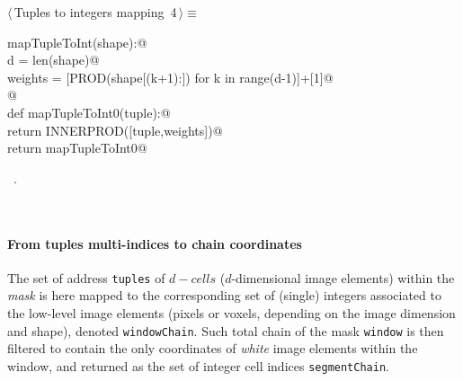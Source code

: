 \documentclass[11pt,oneside]{article}	%
\begin{document}
\begin{flushleft} \small
\begin{minipage}{\linewidth} \label{scrap6}
\protect{}$\langle\,$Tuples to integers mapping\nobreak\ {\footnotesize 4}$\,\rangle\equiv$
\vspace{-1ex}
\begin{list}{}{} \item
\mbox{}\verb@def mapTupleToInt(shape):@\\
\mbox{}\verb@   d = len(shape)@\\
\mbox{}\verb@   weights = [PROD(shape[(k+1):]) for k in range(d-1)]+[1]@\\
\mbox{}\verb@   @\\
\mbox{}\verb@   def mapTupleToInt0(tuple):@\\
\mbox{}\verb@      return INNERPROD([tuple,weights])@\\
\mbox{}\verb@   return mapTupleToInt0@\\
\mbox{}\verb@@{\NWsep}
\end{list}
\vspace{-1ex}
\footnotesize\addtolength{\baselineskip}{-1ex}
\begin{list}{}{\setlength{\itemsep}{-\parsep}\setlength{\itemindent}{-\leftmargin}}
\item \NWtxtMacroRefIn\ .
\end{list}
\end{minipage}\\[4ex]
\end{flushleft}


\paragraph{From tuples multi-indices to chain coordinates}

The set of address \texttt{tuples} of $d-cells$ ($d$-dimensional image elements) within the \emph{mask} is here mapped to the corresponding set of (single) integers associated to the low-level image elements (pixels or voxels, depending on the image dimension and shape), denoted \texttt{windowChain}. Such total chain of the mask \texttt{window} is then filtered to contain the only coordinates of \emph{white} image elements within the window, and returned as the set of integer cell indices \texttt{segmentChain}.
\end{document}
